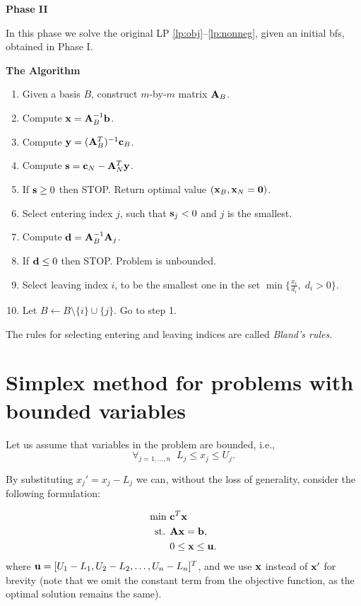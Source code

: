 \documentclass[10pt]{article}
\begin{document}
\medskip
{\bf Phase II}

In this phase we solve the original LP \eqref{lp:obj}--\eqref{lp:nonneg}, given an initial bfs, obtained in Phase I.

\medskip
{\bf The Algorithm}
\begin{enumerate}
    \item Given a basis $B$, construct $m$-by-$m$ matrix ${\bf A}_B$.
    \item Compute ${\bf x} = {\bf A}_B^{-1} {\bf b}$.
    \item Compute ${\bf y} = ({\bf A}_B^T)^{-1} {\bf c}_B$.
    \item Compute ${\bf s} = {\bf c}_N - {\bf A}_N^T {\bf y}$.
    \item If ${\bf s} \geq 0$ then STOP. Return optimal value $({\bf x}_B, {\bf x}_N = {\bf 0})$.
    \item Select entering index $j$, such that ${\bf s}_j < 0$ and $j$ is the smallest.
    \item Compute ${\bf d} = {\bf A}_B^{-1} {\bf A}_j$. 
    \item If ${\bf d} \leq 0$ then STOP. Problem is unbounded.
    \item Select leaving index $i$, to be the smallest one in the set $\min \{ \frac{x_i}{d_i}, \; d_i > 0 \}$.
    \item Let $B \leftarrow B \setminus \{ i \} \cup \{ j \}$. Go to step 1.
\end{enumerate}

The rules for selecting entering and leaving indices are called {\em Bland's rules}.

\section*{Simplex method for problems with bounded variables}

Let us assume that variables in the problem are bounded, i.e.,
$$
    \forall_{j=1,\ldots,n} \;\; L_j \leq x_j \leq U_j.
$$

By substituting $x_j' = x_j - L_j$ we can, without the loss of generality, consider the following formulation:

\begin{align}
    \textrm{min } & {\bf c}^T {\bf x} \label{lp:obj_sub} \\
    \textrm{st. } & {\bf A} {\bf x} = {\bf b}, \label{lp:Axeqb_sub} \\
                  & 0 \leq {\bf x} \leq {\bf u}. \label{lp:bounds}
\end{align}
where ${\bf u} = [U_1 - L_1, U_2 - L_2, \ldots, U_n - L_n]^T$, and we use ${\bf x}$ instead of ${\bf x}'$ for brevity (note that we omit the constant term from the objective function, as the optimal solution remains the same).
\end{document}
